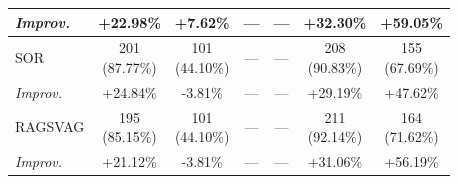 \begin{table}[t]
\begin{tabular}{@{}lcc cc cc@{}}
\textit{Improv.} & +22.98\% & +7.62\% & --- & --- & \textbf{+32.30}\% & \textbf{+59.05}\% \\[1ex]
\hline
SOR     & \tabincell{c}{201\\(87.77\%)} & \tabincell{c}{101\\(44.10\%)} & --- & --- & \tabincell{c}{208\\(90.83\%)} & \tabincell{c}{155\\(67.69\%)} \\
\textit{Improv.} & +24.84\% & -3.81\% & --- & --- & +29.19\% & +47.62\% \\[1ex]
\hline
RAGSVAG & \tabincell{c}{195\\(85.15\%)} & \tabincell{c}{101\\(44.10\%)} & --- & --- & \tabincell{c}{211\\(92.14\%)} & \tabincell{c}{164\\(71.62\%)} \\
\textit{Improv.} & +21.12\% & -3.81\% & --- & --- & +31.06\% & +56.19\% \\ \bottomrule
\end{tabular}
\end{table}





